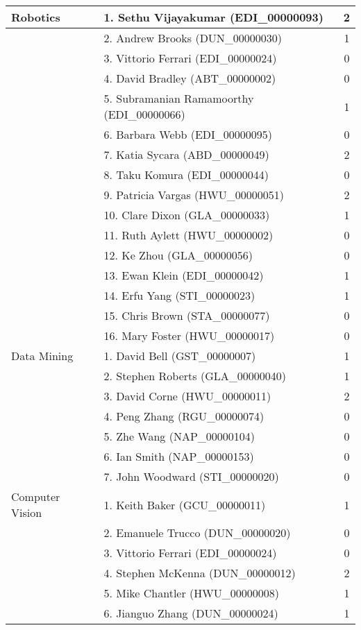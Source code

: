 \begin{longtable}{|l|l|c|}
\hline Robotics & 1. Sethu Vijayakumar (EDI\_00000093) & 2 \\
\hline  & 2. Andrew Brooks (DUN\_00000030) & 1 \\
\hline  & 3. Vittorio Ferrari (EDI\_00000024) & 0 \\
\hline  & 4. David Bradley (ABT\_00000002) & 0 \\
\hline  & 5. Subramanian Ramamoorthy (EDI\_00000066) & 1 \\
\hline  & 6. Barbara Webb (EDI\_00000095) & 0 \\
\hline  & 7. Katia Sycara (ABD\_00000049) & 2 \\
\hline  & 8. Taku Komura (EDI\_00000044) & 0 \\
\hline  & 9. Patricia Vargas (HWU\_00000051) & 2 \\
\hline  & 10. Clare Dixon (GLA\_00000033) & 1 \\
\hline  & 11. Ruth Aylett (HWU\_00000002) & 0 \\
\hline  & 12. Ke Zhou (GLA\_00000056) & 0 \\
\hline  & 13. Ewan Klein (EDI\_00000042) & 1 \\
\hline  & 14. Erfu Yang (STI\_00000023) & 1 \\
\hline  & 15. Chris Brown (STA\_00000077) & 0 \\
\hline  & 16. Mary Foster (HWU\_00000017) & 0 \\
\hline Data Mining & 1. David Bell (GST\_00000007) & 1 \\
\hline  & 2. Stephen Roberts (GLA\_00000040) & 1 \\
\hline  & 3. David Corne (HWU\_00000011) & 2 \\
\hline  & 4. Peng Zhang (RGU\_00000074) & 0 \\
\hline  & 5. Zhe Wang (NAP\_00000104) & 0 \\
\hline  & 6. Ian Smith (NAP\_00000153) & 0 \\
\hline  & 7. John Woodward (STI\_00000020) & 0 \\
\hline Computer Vision & 1. Keith Baker (GCU\_00000011) & 1 \\
\hline  & 2. Emanuele Trucco (DUN\_00000020) & 0 \\
\hline  & 3. Vittorio Ferrari (EDI\_00000024) & 0 \\
\hline  & 4. Stephen McKenna (DUN\_00000012) & 2 \\
\hline  & 5. Mike Chantler (HWU\_00000008) & 1 \\
\hline  & 6. Jianguo Zhang (DUN\_00000024) & 1 \\

\end{longtable}
